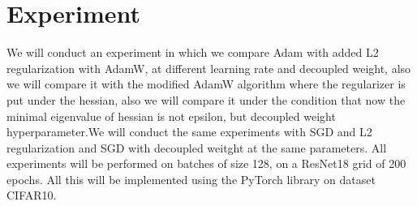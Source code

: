 \documentclass{article}
\begin{document}
\section{Experiment}

We will conduct an experiment in which we compare Adam with added L2 regularization with AdamW, at different learning rate and decoupled weight, also we will compare it with the modified AdamW algorithm where the regularizer is put under the hessian, also we will compare it under the condition that now the minimal eigenvalue of hessian is not epsilon, but decoupled weight hyperparameter.We will conduct the same experiments with SGD and L2 regularization and SGD with decoupled weitght at the same parameters. All experiments will be performed on batches of size 128, on a ResNet18 grid of 200 epochs. All this will be implemented using the PyTorch library on dataset CIFAR10.




\end{document}
